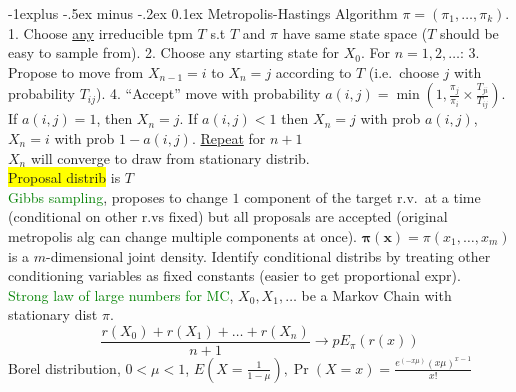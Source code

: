 \documentclass[landscape]{article}
\makeatletter
\renewcommand{\subsection}{\@startsection{subsection}{2}{0mm}%
                                {-1explus -.5ex minus -.2ex}%
                                {0.1ex}%
                                {\color{orange}\normalfont\normalsize\bfseries}}
\makeatother
\begin{document}
\begin{multicols*}{3}
\subsection{Metropolis-Hastings Algorithm}
$\pi = (\pi_1, \ldots, \pi_k)$. 1. Choose \underline{any} irreducible
tpm $T$ s.t $T$ and $\pi$ have same state space ($T$ should be easy to
sample from). 2. Choose any starting state for $X_0$. For
$n = 1,2, \ldots$: 3. Propose to move from $X_{n-1} = i$ to $X_n = j$
according to $T$ (i.e.\ choose $j$ with probability $T_{ij}$). 4. ``Accept'' move with probability
$a(i,j) = \min \left(1, \frac{\pi_{j}}{\pi_i} \times
  \frac{T_{ji}}{T_{ij}}\right)$. If $a(i,j) = 1$, then $X_n = j$. If
$a(i,j) < 1$ then $X_n = j $ with prob $a(i,j)$, $X_n = i$ with prob
$1 - a(i,j)$. \underline{Repeat} for $n + 1$ \\ $X_n$ will converge to
draw from stationary distrib.
\\ \colorbox{yellow}{Proposal distrib} is $T$\\ \textcolor{green}{Gibbs sampling},
proposes to change $1$ component of the target r.v.\ at a time
(conditional on other r.vs fixed) but all
proposals are accepted (original metropolis alg can change multiple
components at once). $\mathbf{\pi(x)} = \pi(x_1, \ldots, x_m)$ is a
$m$-dimensional joint density. Identify conditional distribs by
treating other conditioning variables as fixed constants (easier to
get proportional expr).
\\
\textcolor{green}{Strong law of large numbers for MC},
$X_0, X_1, \ldots$ be a Markov Chain with stationary dist $\pi$.
$$\frac{r(X_0) + r(X_1) + \ldots + r(X_n)}{n+1} \to pE_\pi (r(x))$$
Borel distribution, $0 < \mu < 1$,
$E(X = \frac{1}{1-\mu}), \Pr(X = x) = \frac{e^{(-x\mu)}(x\mu)^{x -
    1}}{x!}$

\end{multicols*}
\end{document}
